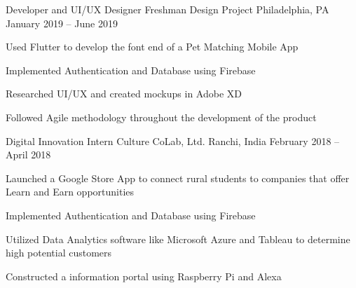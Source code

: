 \begin{cventries}
	\vspace{-2mm}
	\cventry
	{Developer and UI/UX Designer}
	{Freshman Design Project}
	{Philadelphia, PA}
	{January 2019 – June 2019}
	{\begin{cvitems}
		\item {Used Flutter to develop the font end of a Pet Matching Mobile App}
		\item {Implemented Authentication and Database using Firebase}
		\item {Researched UI/UX and created mockups in Adobe XD}
		\item {Followed Agile methodology throughout the development of the product}
		\end{cvitems}}
	
	\vspace{-2mm}
	\cventry
	{Digital Innovation Intern}
	{Culture CoLab, Ltd.}
	{Ranchi, India}
	{February 2018 – April 2018}
	{\begin{cvitems}
		\item {Launched a Google Store App to connect rural students to companies that offer Learn and Earn opportunities}
		\item {Implemented Authentication and Database using Firebase}
		\item {Utilized Data Analytics software like Microsoft Azure and Tableau to determine high potential customers}
		\item {Constructed a information portal using Raspberry Pi and Alexa}
		\end{cvitems}}

\end{cventries}
